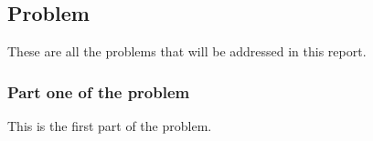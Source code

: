 \subsection{Problem}
These are all the problems that will be addressed in this report.
\subsubsection{Part one of the problem}
This is the first part of the problem.
